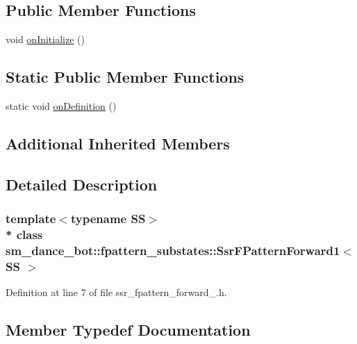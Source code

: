 \subsection*{Public Member Functions}
\begin{DoxyCompactItemize}
\item 
void \hyperlink{structsm__dance__bot_1_1fpattern__substates_1_1SsrFPatternForward1_aa05e7d73a7e1cc76531d3273ca6089a4}{on\+Initialize} ()
\end{DoxyCompactItemize}
\subsection*{Static Public Member Functions}
\begin{DoxyCompactItemize}
\item 
static void \hyperlink{structsm__dance__bot_1_1fpattern__substates_1_1SsrFPatternForward1_aa7458f47c18f3ad6795e910d298a9582}{on\+Definition} ()
\end{DoxyCompactItemize}
\subsection*{Additional Inherited Members}


\subsection{Detailed Description}
\subsubsection*{template$<$typename SS$>$\\*
class sm\+\_\+dance\+\_\+bot\+::fpattern\+\_\+substates\+::\+Ssr\+F\+Pattern\+Forward1$<$ S\+S $>$}



Definition at line 7 of file ssr\+\_\+fpattern\+\_\+forward\+\_.\+h.



\subsection{Member Typedef Documentation}
